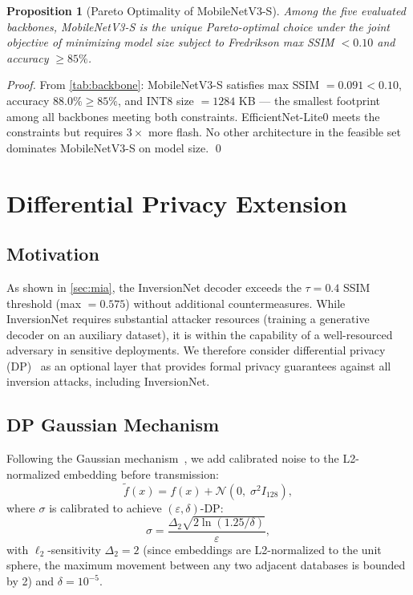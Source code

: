 \documentclass[journal]{IEEEtran}
\newtheorem{proposition}[theorem]{Proposition}
\newcommand{\eps}{\varepsilon}
\newcommand{\MN}{MobileNetV3-S\xspace}
\begin{document}
\begin{proposition}[Pareto Optimality of \MN]
\label{prop:pareto}
Among the five evaluated backbones, \MN is the unique Pareto-optimal
choice under the joint objective of minimizing model size subject to
Fredrikson max SSIM $< 0.10$ and accuracy $\geq 85\%$.
\end{proposition}

\begin{proof}
From \cref{tab:backbone}: \MN satisfies max SSIM $= 0.091 < 0.10$,
accuracy $88.0\% \geq 85\%$, and INT8 size $= 1284$ KB --- the
smallest footprint among all backbones meeting both constraints.
EfficientNet-Lite0 meets the constraints but requires $3\times$ more flash.
No other architecture in the feasible set dominates \MN on model size.
\qed
\end{proof}

\section{Differential Privacy Extension}
\label{sec:dp}

\subsection{Motivation}

As shown in \cref{sec:mia}, the InversionNet decoder exceeds
the $\tau = 0.4$ SSIM threshold (max $= 0.575$) without additional
countermeasures.
While InversionNet requires substantial attacker resources (training
a generative decoder on an auxiliary dataset), it is within the
capability of a well-resourced adversary in sensitive deployments.
We therefore consider differential privacy (DP)~\cite{Dwork2014}
as an optional layer that provides formal privacy guarantees against
all inversion attacks, including InversionNet.

\subsection{DP Gaussian Mechanism}

Following the Gaussian mechanism~\cite{Dwork2014}, we add
calibrated noise to the L2-normalized embedding before transmission:
\begin{equation}
  \tilde{f}(x) = f(x) + \mathcal{N}\!\left(0,\; \sigma^2 I_{128}\right),
  \label{eq:dpnoise}
\end{equation}
where $\sigma$ is calibrated to achieve $(\eps, \delta)$-DP:
\begin{equation}
  \sigma = \frac{\Delta_2 \sqrt{2 \ln(1.25/\delta)}}{\eps},
  \label{eq:sigma}
\end{equation}
with $\ell_2$-sensitivity $\Delta_2 = 2$ (since embeddings are
L2-normalized to the unit sphere, the maximum movement between any
two adjacent databases is bounded by 2) and $\delta = 10^{-5}$.
\end{document}
